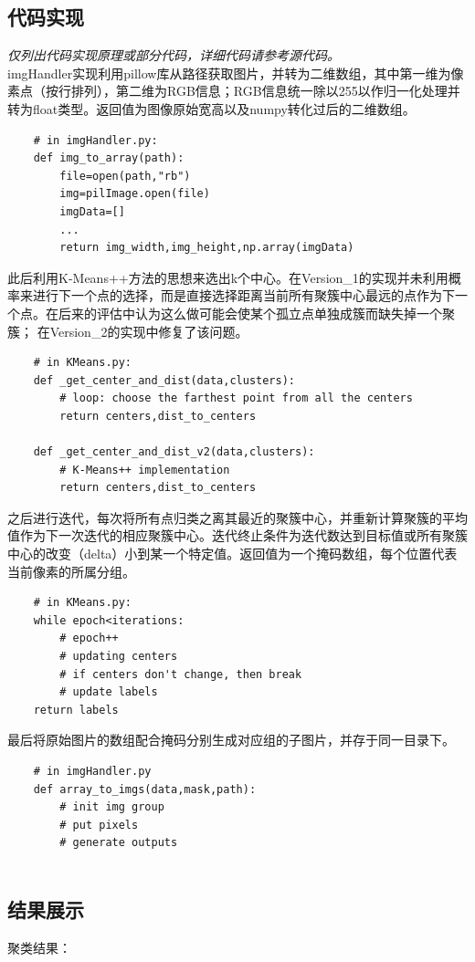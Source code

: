 \documentclass{article}
\begin{document}
\subsection{代码实现}
\textit{仅列出代码实现原理或部分代码，详细代码请参考源代码。}\\
\lstset{
    language=python,
    frame=shadowbox,
    breaklines=true
}
imgHandler实现利用pillow库从路径获取图片，并转为二维数组，其中第一维为像素点（按行排列），第二维为RGB信息；RGB信息统一除以255以作归一化处理并转为float类型。返回值为图像原始宽高以及numpy转化过后的二维数组。
\begin{lstlisting}
    # in imgHandler.py:
    def img_to_array(path):
        file=open(path,"rb")
        img=pilImage.open(file)
        imgData=[]
        ...
        return img_width,img_height,np.array(imgData)
\end{lstlisting}
此后利用K-Means++方法的思想来选出k个中心。在Version\_1的实现并未利用概率来进行下一个点的选择，而是直接选择距离当前所有聚簇中心最远的点作为下一个点。在后来的评估中认为这么做可能会使某个孤立点单独成簇而缺失掉一个聚簇；
在Version\_2的实现中修复了该问题。
\begin{lstlisting}
    # in KMeans.py:
    def _get_center_and_dist(data,clusters):
        # loop: choose the farthest point from all the centers
        return centers,dist_to_centers

    def _get_center_and_dist_v2(data,clusters):
        # K-Means++ implementation
        return centers,dist_to_centers
\end{lstlisting}
之后进行迭代，每次将所有点归类之离其最近的聚簇中心，并重新计算聚簇的平均值作为下一次迭代的相应聚簇中心。迭代终止条件为迭代数达到目标值或所有聚簇中心的改变（delta）小到某一个特定值。返回值为一个掩码数组，每个位置代表当前像素的所属分组。
\begin{lstlisting}
    # in KMeans.py:
    while epoch<iterations:
        # epoch++
        # updating centers
        # if centers don't change, then break
        # update labels
    return labels
\end{lstlisting}
最后将原始图片的数组配合掩码分别生成对应组的子图片，并存于同一目录下。
\begin{lstlisting}
    # in imgHandler.py
    def array_to_imgs(data,mask,path):
        # init img group
        # put pixels
        # generate outputs
    
\end{lstlisting}

\subsection{结果展示}
聚类结果：
\end{document}
